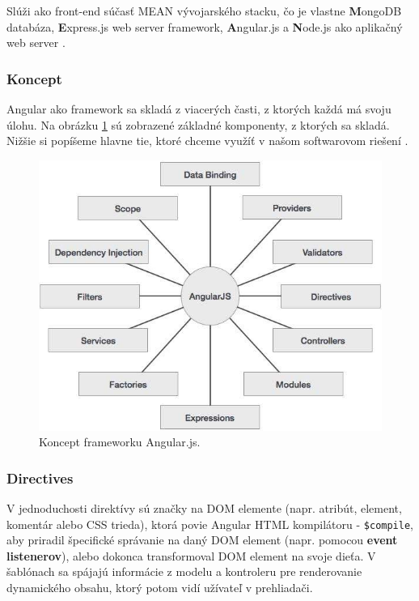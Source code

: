 Slúži ako front-end súčasť MEAN vývojarského stacku, čo je vlastne \textbf{M}ongoDB databáza, \textbf{E}xpress.js web server framework, \textbf{A}ngular.js  a \textbf{N}ode.js ako aplikačný web server \cite{angular-wiki}\cite{angular-docs}.

\subsubsection{Koncept}
Angular ako framework sa skladá z viacerých časti, z ktorých každá má svoju úlohu. Na obrázku \ref{img-angular-concept} sú zobrazené základné komponenty, z ktorých sa skladá. Nižšie si popíšeme hlavne tie, ktoré chceme využíť v našom softwarovom riešení \cite{angular-concept}.

\begin{figure}[H]
  \centering
  \includegraphics[scale=0.5]{img/angular/angularjs_concepts.jpg}
  \caption{Koncept frameworku Angular.js.}
  \label{img-angular-concept}
\end{figure}

\subsubsection{Directives}
V jednoduchosti direktívy sú značky na DOM elemente (napr. atribút, element, komentár alebo CSS trieda), ktorá povie Angular HTML kompilátoru - \verb|$compile|, aby priradil špecifické správanie na daný DOM element (napr. pomocou \textbf{event listenerov}), alebo dokonca transformoval DOM element na svoje dieťa. V šablónach sa spájajú informácie z modelu a kontroleru pre renderovanie dynamického obsahu, ktorý potom vidí užívateľ v prehliadači.

